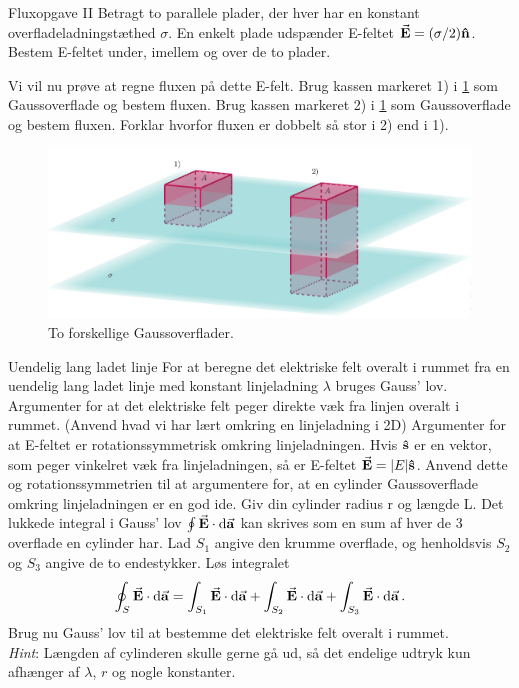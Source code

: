 \documentclass[crop=false, class=memoir]{standalone}
\begin{document}
\begin{opgave}[2]{Fluxopgave II}
Betragt to parallele plader, der hver har en konstant overfladeladningstæthed $\sigma$. En enkelt plade udspænder E-feltet $\va{E}=(\sigma/2)\vu{n}$.
\opg Bestem E-feltet under, imellem og over de to plader.

\opg Vi vil nu prøve at regne fluxen på dette E-felt. Brug kassen markeret 1) i \cref{em:fig:flux2} som  Gaussoverflade og bestem fluxen.
\opg Brug kassen markeret 2) i \cref{em:fig:flux2} som  Gaussoverflade og bestem fluxen.
\opg Forklar hvorfor fluxen er dobbelt så stor i 2) end i 1).
    \begin{figure}[]
        \centering
        \includegraphics[width=\textwidth]{Elektro/Elekfig/tokapacitor.JPG}
        \caption{To forskellige Gaussoverflader.}
        \label{em:fig:flux2}
    \end{figure}
\end{opgave}

\begin{opgave}[3]{Uendelig lang ladet linje}
    For at beregne det elektriske felt overalt i rummet fra en uendelig lang ladet linje med konstant linjeladning $\lambda$ bruges Gauss' lov.
    \opg Argumenter for at det elektriske felt peger direkte væk fra linjen overalt i rummet. (Anvend hvad vi har lært omkring en linjeladning i 2D)
    \opg Argumenter for at E-feltet er rotationssymmetrisk omkring linjeladningen.
    \opg Hvis $\vu{s}$ er en vektor, som peger vinkelret væk fra linjeladningen, så er E-feltet $\va{E}=|E|\vu{s}$. Anvend dette og rotationssymmetrien til at argumentere for, at en cylinder Gaussoverflade omkring linjeladningen er en god ide. 
    \opg Giv din cylinder radius r og længde L. Det lukkede integral i Gauss' lov $\oint\va{E}\cdot\dd{\va{a}}$ kan skrives som en sum af hver de 3 overflade en cylinder har. Lad $S_1$ angive den krumme overflade, og henholdsvis $S_2$ og $S_3$ angive de to endestykker. Løs integralet
    \begin{align*}
        \oint_S \va E \cdot \dd{\va a} = \int_{S_1} \va E \cdot \dd{\va a} + \int_{S_2} \va E \cdot \dd{\va a} + \int_{S_3} \va E \cdot \dd{\va a}.
    \end{align*}
    \opg Brug nu Gauss' lov til at bestemme det elektriske felt overalt i rummet. \\
    \emph{Hint}: Længden af cylinderen skulle gerne gå ud, så det endelige udtryk kun afhænger af $\lambda$, $r$ og nogle konstanter.
\end{opgave}
\end{document}
